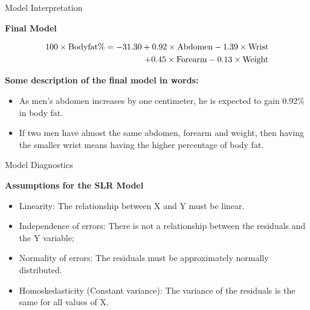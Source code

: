 \documentclass{beamer}
\begin{document}
\begin{frame}{Model Interpretation}
\begin{flushleft}
\textbf{Final Model}
\end{flushleft}
\begin{align*}
\rm
100\times Body fat \% = -31.30 + 0.92\times Abdomen -1.39\times Wrist \\
\rm
+0.45\times Forearm -0.13\times Weight
\end{align*}

\begin{flushleft}
\textbf{Some description of the final model in words:}
\end{flushleft}
 \begin{itemize}
    \item As men's abdomen increases by one centimeter, he is expected to gain 0.92\% in body fat.
    \item If two men have almost the same abdomen, forearm and weight, then having the smaller wrist means having the higher percentage of body fat.
\end{itemize} 

\end{frame}

\begin{frame}{Model Diagnostics}
\begin{flushleft}
\textbf{Assumptions for the SLR Model}
\end{flushleft}
\begin{itemize}
\item Linearity: The relationship between X and Y must be linear.
\item Independence of errors: There is not a relationship between the residuals and the Y variable;
\item Normality of errors: The residuals must be approximately normally distributed.
\item Homoskedasticity (Constant variance): The variance of the residuals is the same for all values of X.
\end{itemize}

\end{frame}
\end{document}
